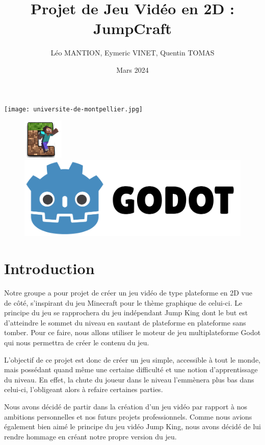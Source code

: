 \documentclass{report}
\date{Mars 2024}
\author{Léo MANTION, Eymeric VINET, Quentin TOMAS}
\title{Projet de Jeu Vidéo en 2D : JumpCraft}
\makeatletter
\renewcommand{\maketitle}{
  \begin{titlepage}
    \begin{flushleft}
      \texttt{[image: universite-de-montpellier.jpg]}
    \end{flushleft}
    \vspace{4cm}
    \centering
    {\huge \bfseries \@title \par}
    \vspace{1cm}
    {\Large \@author \par}
    \vspace{1cm}
    {\large \@date \par}
    \vfill\null
  \end{titlepage}
}
\makeatother
\begin{document}
\maketitle

\tableofcontents
\begin{figure}
    \centering
    \includegraphics[width=0.25\linewidth]{Logo.png}
    \centering
    \includegraphics[width=0.5\linewidth]{Godot.png}
\end{figure}
\clearpage

\section{Introduction}

Notre groupe a pour projet de créer un jeu vidéo de type plateforme en 2D vue de côté, s’inspirant du jeu Minecraft pour le thème graphique de celui-ci. Le principe du jeu se rapprochera du jeu indépendant Jump King dont le but est d’atteindre le sommet du niveau en sautant de plateforme en plateforme sans tomber. Pour ce faire, nous allons utiliser le moteur de jeu multiplateforme Godot qui nous permettra de créer le contenu du jeu.

L’objectif de ce projet est donc de créer un jeu simple, accessible à tout le monde, mais possédant quand même une certaine difficulté et une notion d’apprentissage du niveau. En effet, la chute du joueur dans le niveau l’emmènera plus bas dans celui-ci, l’obligeant alors à refaire certaines parties.

Nous avons décidé de partir dans la création d’un jeu vidéo par rapport à nos ambitions personnelles et nos futurs projets professionnels. Comme nous avions également bien aimé le principe du jeu vidéo Jump King, nous avons décidé de lui rendre hommage en créant notre propre version du jeu.

\vspace{1cm}
\end{document}

